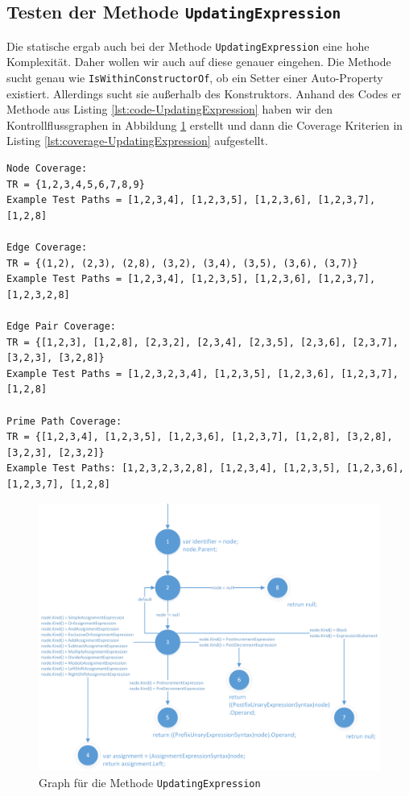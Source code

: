 \subsection{Testen der Methode \texttt{UpdatingExpression}}
Die statische ergab auch bei der Methode \texttt{UpdatingExpression} eine hohe Komplexität. Daher wollen wir auch auf diese genauer eingehen. Die Methode sucht genau wie \texttt{IsWithinConstructorOf}, ob ein Setter einer Auto-Property existiert. Allerdings sucht sie außerhalb des Konstruktors. Anhand des Codes er Methode aus Listing \ref{lst:code-UpdatingExpression} haben wir den Kontrollflussgraphen in Abbildung \ref{fig:graph-UpdatingExpression} erstellt und dann die Coverage Kriterien in Listing \ref{lst:coverage-UpdatingExpression} aufgestellt.
\begin{lstlisting}[caption={Coverage für die Mehtode \texttt{UpdatingExpression}},
label=lst:coverage-UpdatingExpression]
Node Coverage:
TR = {1,2,3,4,5,6,7,8,9}
Example Test Paths = [1,2,3,4], [1,2,3,5], [1,2,3,6], [1,2,3,7], [1,2,8]

Edge Coverage:
TR = {(1,2), (2,3), (2,8), (3,2), (3,4), (3,5), (3,6), (3,7)}
Example Test Paths = [1,2,3,4], [1,2,3,5], [1,2,3,6], [1,2,3,7], [1,2,3,2,8]

Edge Pair Coverage:
TR = {[1,2,3], [1,2,8], [2,3,2], [2,3,4], [2,3,5], [2,3,6], [2,3,7], [3,2,3], [3,2,8]}
Example Test Paths = [1,2,3,2,3,4], [1,2,3,5], [1,2,3,6], [1,2,3,7], [1,2,8]

Prime Path Coverage:
TR = {[1,2,3,4], [1,2,3,5], [1,2,3,6], [1,2,3,7], [1,2,8], [3,2,8], [3,2,3], [2,3,2]}
Example Test Paths: [1,2,3,2,3,2,8], [1,2,3,4], [1,2,3,5], [1,2,3,6], [1,2,3,7], [1,2,8]
\end{lstlisting}
\begin{figure}[h]
	\centering
	\includegraphics[width=\textwidth]{images/GraphUpdatingExpression.png}
	\caption{Graph für die Methode \texttt{UpdatingExpression}}
	\label{fig:graph-UpdatingExpression}
\end{figure}
